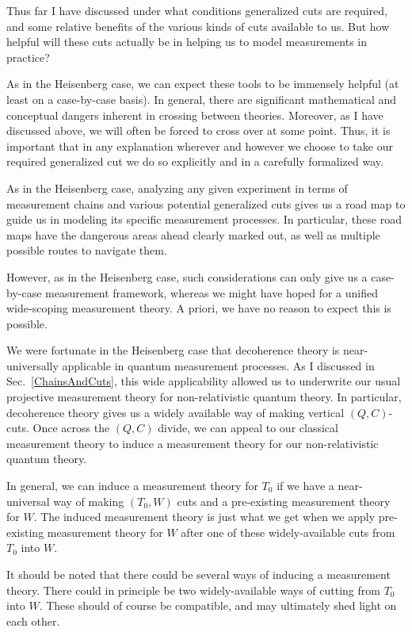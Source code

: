 \documentclass[prd,twocolumn,superscriptaddress,floatfix,amsmath,amssymb,amsfonts,nofootinbib]{revtex4-2}
\begin{document}
Thus far I have discussed under what conditions generalized cuts are required, and some relative benefits of the various kinds of cuts available to us. But how helpful will these cuts actually be in helping us to model measurements in practice? 

As in the Heisenberg case, we can expect these tools to be immensely helpful (at least on a case-by-case basis). In general, there are significant mathematical and conceptual dangers inherent in crossing between theories. Moreover, as I have discussed above, we will often be forced to cross over at some point. Thus, it is important that in any explanation wherever and however we choose to take our required generalized cut we do so explicitly and in a carefully formalized way.

As in the Heisenberg case, analyzing any given experiment in terms of measurement chains and various potential generalized cuts gives us a road map to guide us in modeling its specific measurement processes. In particular, these road maps have the dangerous areas ahead clearly marked out, as well as multiple possible routes to navigate them.

However, as in the Heisenberg case, such considerations can only give us a case-by-case measurement framework, whereas we might have hoped for a unified wide-scoping measurement theory. A priori, we have no reason to expect this is possible. 

We were fortunate in the Heisenberg case that decoherence theory is near-universally applicable in quantum measurement processes. As I discussed in Sec.~\ref{ChainsAndCuts}, this wide applicability allowed us to underwrite our usual projective measurement theory for non-relativistic quantum theory. In particular, decoherence theory gives us a widely available way of making vertical $(Q,C)$-cuts. Once across the $(Q,C)$ divide, we can appeal to our classical measurement theory to induce a measurement theory for our non-relativistic quantum theory. 

In general, we can induce a measurement theory for $T_0$ if we have a near-universal  way of making $(T_0,W)$ cuts and a pre-existing measurement theory for $W$. The induced measurement theory is just what we get when we apply pre-existing measurement theory for $W$ after one of these widely-available cuts from $T_0$ into $W$.

It should be noted that there could be several ways of inducing a measurement theory. There could in principle be two widely-available ways of cutting from $T_0$ into $W$. These should of course be compatible, and may ultimately shed light on each other. 
\end{document}
